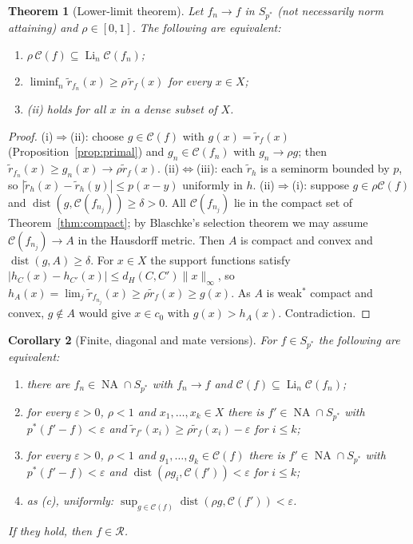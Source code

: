 \documentclass[10pt]{amsart}
\newtheorem{theorem}{Theorem}[section]
\newtheorem{corollary}[theorem]{Corollary}
\theoremstyle{definition}
\theoremstyle{remark}
\newcommand{\NA}{\operatorname{NA}}
\newcommand{\dist}{\operatorname{dist}}
\newcommand{\Cset}{\mathcal C}
\newcommand{\Li}{\operatorname*{Li}}
\newcommand{\Rec}{\mathcal R}
\begin{document}
\begin{theorem}[Lower-limit theorem]\label{thm:lowerlimit}
Let $f_n\to f$ in $S_{p^*}$ \textup{(}not necessarily norm
attaining\textup{)} and $\rho\in[0,1]$.  The following are equivalent:
\begin{enumerate}
\item[(i)] $\rho\,\Cset(f)\subseteq\Li_n\Cset(f_n)$;
\item[(ii)] $\liminf_n\tilde r_{f_n}(x)\ge\rho\,\tilde r_f(x)$ for every
$x\in X$;
\item[(iii)] \textup{(ii)} holds for all $x$ in a dense subset of $X$.
\end{enumerate}
\end{theorem}

\begin{proof}
(i)$\Rightarrow$(ii): choose $g\in\Cset(f)$ with $g(x)=\tilde r_f(x)$
(Proposition~\ref{prop:primal}) and $g_n\in\Cset(f_n)$ with $g_n\to\rho
g$; then $\tilde r_{f_n}(x)\ge g_n(x)\to\rho\tilde r_f(x)$.
(ii)$\Leftrightarrow$(iii): each $\tilde r_h$ is a seminorm bounded by $p$,
so $|\tilde r_h(x)-\tilde r_h(y)|\le p(x-y)$ uniformly in $h$.
(ii)$\Rightarrow$(i): suppose $g\in\rho\Cset(f)$ and
$\dist(g,\Cset(f_{n_j}))\ge\delta>0$.  All $\Cset(f_{n_j})$ lie in the
compact set of Theorem~\ref{thm:compact}; by Blaschke's selection theorem
we may assume $\Cset(f_{n_j})\to A$ in the Hausdorff metric.  Then $A$ is
compact and convex and $\dist(g,A)\ge\delta$.  For $x\in X$ the support
functions satisfy $|h_C(x)-h_{C'}(x)|\le d_H(C,C')\|x\|_\infty$, so
$h_A(x)=\lim_j\tilde r_{f_{n_j}}(x)\ge\rho\tilde r_f(x)\ge g(x)$.  As $A$
is weak$^*$ compact and convex, $g\notin A$ would give $x\in c_0$ with
$g(x)>h_A(x)$.  Contradiction.
\end{proof}

\begin{corollary}[Finite, diagonal and mate versions]\label{cor:finite}
For $f\in S_{p^*}$ the following are equivalent:
\begin{enumerate}
\item[(a)] there are $f_n\in\NA\cap S_{p^*}$ with $f_n\to f$ and
$\Cset(f)\subseteq\Li_n\Cset(f_n)$;
\item[(b)] for every $\varepsilon>0$, $\rho<1$ and $x_1,\dots,x_k\in X$ there
is $f'\in\NA\cap S_{p^*}$ with $p^*(f'-f)<\varepsilon$ and
$\tilde r_{f'}(x_i)\ge\rho\tilde r_f(x_i)-\varepsilon$ for $i\le k$;
\item[(c)] for every $\varepsilon>0$, $\rho<1$ and $g_1,\dots,g_k\in\Cset(f)$
there is $f'\in\NA\cap S_{p^*}$ with $p^*(f'-f)<\varepsilon$ and
$\dist(\rho g_i,\Cset(f'))<\varepsilon$ for $i\le k$;
\item[(d)] as \textup{(c)}, uniformly:
$\sup_{g\in\Cset(f)}\dist(\rho g,\Cset(f'))<\varepsilon$.
\end{enumerate}
If they hold, then $f\in\Rec$.
\end{corollary}
\end{document}
